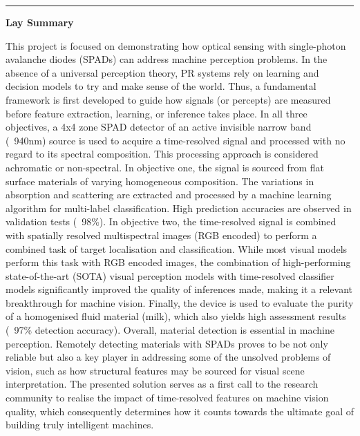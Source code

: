 \documentclass[12pt,a4paper,oneside]{report}
\begin{document}
\newpage
\thispagestyle{empty}
\vspace*{-1.5cm}
\hfill\textcolor{gray}{\textit{}}
\vspace{0.2cm}
\noindent\rule{\textwidth}{0.5pt}
\vspace{1cm}
{\fontsize{12pt}{18pt}\selectfont
{\fontsize{14pt}{21pt}\selectfont\textbf{Lay Summary}}

This project is focused on demonstrating how optical sensing with single-photon avalanche diodes (SPADs) can address machine perception problems. In the absence of a universal perception theory, PR systems rely on learning and decision models to try and make sense of the world. Thus, a fundamental framework is first developed to guide how signals (or percepts) are measured before feature extraction, learning, or inference takes place. In all three objectives, a 4x4 zone SPAD detector of an active invisible narrow band (~940nm) source is used to acquire a time-resolved signal and processed with no regard to its spectral composition. This processing approach is considered achromatic or non-spectral. In objective one, the signal is sourced from flat surface materials of varying homogeneous composition. The variations in absorption and scattering are extracted and processed by a machine learning algorithm for multi-label classification. High prediction accuracies are observed in validation tests (~98\%). In objective two, the time-resolved signal is combined with spatially resolved multispectral images (RGB encoded) to perform a combined task of target localisation and classification. While most visual models perform this task with RGB encoded images, the combination of high-performing state-of-the-art (SOTA) visual perception models with time-resolved classifier models significantly improved the quality of inferences made, making it a relevant breakthrough for machine vision. Finally, the device is used to evaluate the purity of a homogenised fluid material (milk), which also yields high assessment results (~97\% detection accuracy). Overall, material detection is essential in machine perception. Remotely detecting materials with SPADs proves to be not only reliable but also a key player in addressing some of the unsolved problems of vision, such as how structural features may be sourced for visual scene interpretation. The presented solution serves as a first call to the research community to realise the impact of time-resolved features on machine vision quality, which consequently determines how it counts towards the ultimate goal of building truly intelligent machines.
}
\vspace*{\fill}
\newpage
\end{document}
